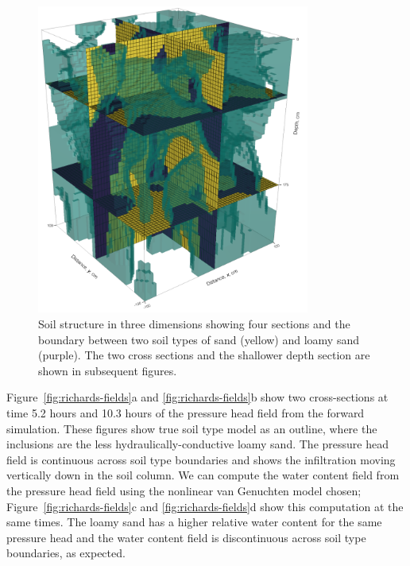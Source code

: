 \documentclass[preprint,review,3p,times,onecolumn,authoryear]{elsarticle}
\begin{document}
\begin{figure}[!htbp]
\begin{center}
\includegraphics[width=0.8\textwidth]{3d_model.png}
\end{center}
\caption{
Soil structure in three dimensions showing four sections and the boundary between two soil types of sand (yellow) and loamy sand (purple). The two cross sections and the shallower depth section are shown in subsequent figures.
}
\label{fig:richards-3d_model}
\end{figure}


Figure~\ref{fig:richards-fields}a and \ref{fig:richards-fields}b show two cross-sections at time 5.2 hours and 10.3 hours of the pressure head field from the forward simulation. These figures show true soil type model as an outline, where the inclusions are the less hydraulically-conductive loamy sand. The pressure head field is continuous across soil type boundaries and shows the infiltration moving vertically down in the soil column. We can compute the water content field from the pressure head field using the nonlinear van Genuchten model chosen; Figure~\ref{fig:richards-fields}c and \ref{fig:richards-fields}d show this computation at the same times. The loamy sand has a higher relative water content for the same pressure head and the water content field is discontinuous across soil type boundaries, as expected.
\end{document}
